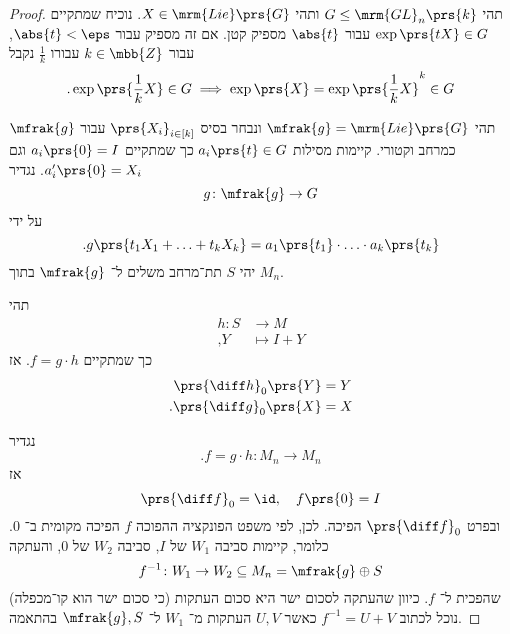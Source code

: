 \documentclass[10pt, twoside]{book}
\begin{document}
\begin{proof}
תהי
$G \leq \mrm{GL}_n\prs{k}$
ותהי
$X \in \mrm{Lie}\prs{G}$.
נוכיח שמתקיים
$\exp\prs{tX} \in G$
עבור
$\abs{t}$
מספיק קטן.
אם זה מספיק עבור
$\abs{t} < \eps$,
עבור
$k \in \mbb{Z}$
עבורו
$\frac{1}{k}$
נקבל
\[\text{.} \exp\prs{\frac{1}{k} X} \in G \implies \exp\prs{X} = \exp\prs{\frac{1}{k}X}^k \in G\]

תהי
$\mfrak{g} = \mrm{Lie}\prs{G}$
ונבחר בסיס
$\prs{X_i}_{i \in [k]}$
עבור
$\mfrak{g}$
כמרחב וקטורי.
קיימות מסילות
$a_i\prs{t} \in G$
כך שמתקיים
$a_i\prs{0} = I$
וגם
$a_i'\prs{0} = X_i$.
נגדיר
\[g \colon \mfrak{g} \to G\]
על ידי
\[\text{.} g\prs{t_1 X_1 + \ldots + t_k X_k} = a_1\prs{t_1} \cdot \ldots \cdot a_k\prs{t_k}\]
יהי
$S$
תת־מרחב משלים ל־%
$\mfrak{g}$
בתוך
$M_n$.

תהי
\begin{align*}
h \colon S &\to M \\
\text{,} Y &\mapsto I + Y
\end{align*}
כך שמתקיים
$f = g\cdot h$.
אז
\begin{align*}
\prs{\diff h}_0\prs{Y} &= Y \\
\text{.} \prs{\diff g}_0\prs{X} &= X
\end{align*}

נגדיר
\[\text{.} f = g \cdot h \colon M_n \to M_n\]
אז
\[\prs{\diff f}_0 = \id, \quad f\prs{0} = I\]
ובפרט
$\prs{\diff f}_0$
הפיכה.
לכן, לפי משפט הפונקציה ההפוכה
$f$
הפיכה מקומית ב־%
$0$.
כלומר, קיימות סביבה
$W_1$
של
$I$,
סביבה
$W_2$
של
$0$,
והעתקה
\[f^{-1} \colon W_1 \to W_2 \subseteq M_n = \mfrak{g} \oplus S\]
שהפכית ל־%
$f$.
כיוון שהעתקה לסכום ישר היא סכום העתקות (כי סכום ישר הוא קו־מכפלה) נוכל לכתוב
$f^{-1} = U+V$
כאשר
$U,V$
העתקות מ־%
$W_1$
ל־%
$\mfrak{g}, S$
בהתאמה.


\end{proof}
\end{document}
